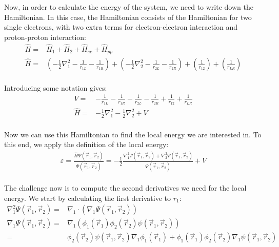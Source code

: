  Now, in order to calculate the energy of the system, we need to write down the Hamiltonian. In this case, the Hamiltonian consists of the Hamiltonian for two single electrons, with two extra terms for electron-electron interaction and proton-proton interaction:
  \begin{align}
  \hat H =& {{\hat H}_1} + {{\hat H}_2} + {{\hat H}_{ee}} + {{\hat H}_{pp}}\\
  \hat H =& \left( { - \frac{1}{2}\nabla _1^2 - \frac{1}{{{r_{1L}}}} - \frac{1}{{{r_{1R}}}}} \right) + \left( { - \frac{1}{2}\nabla _2^2 - \frac{1}{{{r_{2L}}}} - \frac{1}{{{r_{2R}}}}} \right) + \left( {\frac{1}{{{r_{12}}}}} \right) + \left( {\frac{1}{{{r_{LR}}}}} \right)
  \end{align}\\
 Introducing some notation gives:
 \begin{align}
 V =&  - \frac{1}{{{r_{1L}}}} - \frac{1}{{{r_{1R}}}} - \frac{1}{{{r_{2L}}}} - \frac{1}{{{r_{2R}}}} + \frac{1}{{{r_{12}}}} + \frac{1}{{{r_{LR}}}}\\
 \hat H =&  - \frac{1}{2}\nabla _1^2 - \frac{1}{2}\nabla _2^2 + V
 \end{align}\\
 Now we can use this Hamiltonian to find the local energy we are interested in. To this end, we apply the definition of the local energy:
 \begin{align}
 \varepsilon  = \frac{{\hat H\Psi \left( {{{\vec r}_1},{{\vec r}_2}} \right)}}{{\Psi \left( {{{\vec r}_1},{{\vec r}_2}} \right)}} =  - \frac{1}{2}\frac{{\nabla _1^2\Psi \left( {{{\vec r}_1},{{\vec r}_2}} \right) + \nabla _2^2\Psi \left( {{{\vec r}_1},{{\vec r}_2}} \right)}}{{\Psi \left( {{{\vec r}_1},{{\vec r}_2}} \right)}} + V
 \end{align}\\
 The challenge now is to compute the second derivatives we need for the local energy. We start by calculating the first derivative to $r_1$:
 \begin{align}
 \nabla _1^2\Psi \left( {{{\vec r}_1},{{\vec r}_2}} \right) =& \nabla _1^{} \cdot \left( {\nabla _1^{}\Psi \left( {{{\vec r}_1},{{\vec r}_2}} \right)} \right)\\
 \nabla _1^{}\Psi \left( {{{\vec r}_1},{{\vec r}_2}} \right) =& \nabla _1^{}\left( {{\phi _1}\left( {{{\vec r}_1}} \right){\phi _2}\left( {{{\vec r}_2}} \right)\psi \left( {{{\vec r}_1},{{\vec r}_2}} \right)} \right)\nonumber\\
  =& {\phi _2}\left( {{{\vec r}_2}} \right)\psi \left( {{{\vec r}_1},{{\vec r}_2}} \right)\nabla _1^{}{\phi _1}\left( {{{\vec r}_1}} \right) + {\phi _1}\left( {{{\vec r}_1}} \right){\phi _2}\left( {{{\vec r}_2}} \right)\nabla _1^{}\psi \left( {{{\vec r}_1},{{\vec r}_2}} \right)
 \end{align}\\
